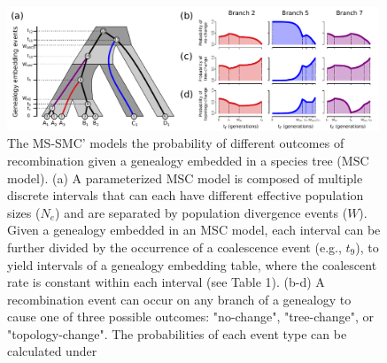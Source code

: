 \documentclass[11pt]{article}
\begin{document}


\begin{figure}
	\centering
	\includegraphics[width=0.99\textwidth]{figures/Fig1-embedding-and-probs-fill.pdf}
	\caption{
		The MS-SMC' models the probability of different outcomes of recombination
		given a genealogy embedded in a species tree (MSC model).
		(a) A parameterized MSC model is composed of multiple discrete intervals that
		can each have different effective population sizes ($N_e$) and are separated 
		by population divergence events ($W$). Given a genealogy embedded in an MSC
		model, each interval can be further divided by the occurrence of a coalescence
		event (e.g., $t_9$), to yield intervals of a genealogy embedding table, where 
		the coalescent rate is constant within each interval (see Table 1).
		(b-d) A recombination event can occur on any branch of a genealogy to cause one
		of three possible outcomes: "no-change", "tree-change", or 
		"topology-change". The probabilities of each event type can be calculated under
}
\end{figure}
\end{document}
